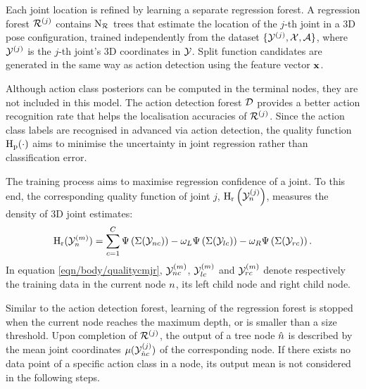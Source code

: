 Each joint location is refined by learning a separate regression forest.  
A regression forest $\mathcal{R}^{(j)}$ contains $\mathrm{N_{\mathcal{R}}}$ trees that estimate the location of the $j$-th joint in a 3D pose configuration, trained independently from the dataset $\{ \mathcal{Y}^{(j)}, \mathcal{X}, \mathcal{A}\}$, where $\mathcal{Y}^{(j)}$ is the $j$-th joint's 3D coordinates in $\mathcal{Y}$. 
Split function candidates are generated in the same way as action detection using the feature vector $\mathbf{x}$. 

Although action class posteriors can be computed in the terminal nodes, they are not included in this model. The action detection forest $\mathcal{D}$ provides a better action recognition rate that helps the localisation accuracies of $\mathcal{R}^{(j)}$. Since the action class labels are recognised in advanced via action detection, the quality function $\mathrm{H_{p}}(\cdot)$ aims to minimise the uncertainty in joint regression rather than classification error.

The training process aims to maximise regression confidence of a joint. To this end, the corresponding quality function of joint $j$, $\mathrm{H_{r}}\left(\mathcal{Y}^{(j)}_{n}\right)$, measures the density of 3D joint estimates: 
\begin{equation}
	\label{eqn/body/qualitycmjr}
	\mathrm{H_{r}}(\mathcal{Y}^{(m)}_{n}) = \displaystyle\sum_{c = 1}^{C} \Psi\left(\Sigma(\mathcal{Y}_{n c})\right) - \omega_{L}\Psi\left(\Sigma(\mathcal{Y}_{lc})\right) - \omega_{R}\Psi\left(\Sigma(\mathcal{Y}_{rc})\right).
\end{equation}
In equation \ref{eqn/body/qualitycmjr}, $\mathcal{Y}^{(m)}_{n c}$, $\mathcal{Y}^{(m)}_{l c}$ and $\mathcal{Y}^{(m)}_{r c}$ denote respectively the training data in the current node $n$, its left child node and right child node.  

Similar to the action detection forest, learning of the regression forest is stopped when the current node reaches the maximum depth, or is smaller than a size threshold.  
Upon completion of $\mathcal{R}^{(j)}$, the output of a tree node ${\hat{n}}$ is described by the mean joint coordinates $\mu(\mathcal{Y}^{(j)}_{{\hat{n}} c})$ of the corresponding node. If there exists no data point of a specific action class in a node, its output mean is not considered in the following steps. 

